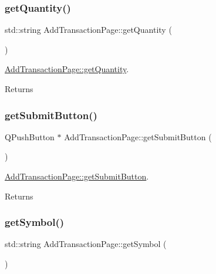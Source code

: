 \subsubsection{\texorpdfstring{get\+Quantity()}{getQuantity()}}
{\footnotesize\ttfamily std\+::string Add\+Transaction\+Page\+::get\+Quantity (\begin{DoxyParamCaption}{ }\end{DoxyParamCaption})}



\mbox{\hyperlink{class_add_transaction_page_a82f790ea61da26f20e03d835d432a841}{Add\+Transaction\+Page\+::get\+Quantity}}. 

\begin{DoxyReturn}{Returns}

\end{DoxyReturn}
\mbox{\label{class_add_transaction_page_a6133a9ed435119693730f49e409ab748}} 
\subsubsection{\texorpdfstring{get\+Submit\+Button()}{getSubmitButton()}}
{\footnotesize\ttfamily Q\+Push\+Button $\ast$ Add\+Transaction\+Page\+::get\+Submit\+Button (\begin{DoxyParamCaption}{ }\end{DoxyParamCaption})}



\mbox{\hyperlink{class_add_transaction_page_a6133a9ed435119693730f49e409ab748}{Add\+Transaction\+Page\+::get\+Submit\+Button}}. 

\begin{DoxyReturn}{Returns}

\end{DoxyReturn}
\mbox{\label{class_add_transaction_page_a6bbaa7bd372987922aa710c543f78668}} 
\subsubsection{\texorpdfstring{get\+Symbol()}{getSymbol()}}
{\footnotesize\ttfamily std\+::string Add\+Transaction\+Page\+::get\+Symbol (\begin{DoxyParamCaption}{ }\end{DoxyParamCaption})}



